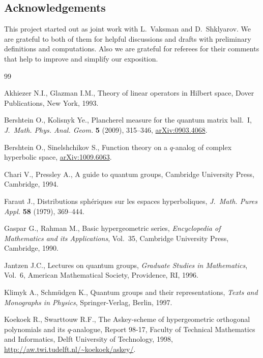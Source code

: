 \documentclass[pdftex]{sigma}
\begin{document}
\subsection*{Acknowledgements}

This project started out as joint work with L.~Vaksman and D.~Shklyarov. We are grateful to both of them for
helpful discussions and drafts with preliminary def\/initions and computations. Also we are grateful for
referees for their comments that help to improve and simplify our exposition.

\begin{thebibliography}{99}

\footnotesize\itemsep=0pt

Akhiezer N.I., Glazman I.M.,
Theory of linear operators in Hilbert space,  Dover Publications, New York, 1993.

Bershtein O., Kolisnyk Ye.,
Plancherel measure for the quantum matrix ball.~I,
{\it J.~Math. Phys. Anal. Geom.} {\bf 5}  (2009), 315--346,
\href{http://arxiv.org/abs/0903.4068}{arXiv:0903.4068}.

Bershtein O., Sinelshchikov S.,
Function theory on a $q$-analog of complex hyperbolic space,
\href{http://arxiv.org/abs/1009.6063}{arXiv:1009.6063}.

Chari V., Pressley A.,
A guide to quantum groups,
Cambridge University Press, Cambridge, 1994.


Faraut J.,
Distributions sph\'eriques sur les espaces hyperboliques,
{\it J.~Math. Pures Appl.} {\bf 58} (1979), 369--444.

Gaspar G., Rahman M.,
Basic hypergeometric series,
{\it Encyclopedia of Mathematics and its Applications}, Vol.~35, Cambridge University Press, Cambridge, 1990.

Jantzen J.C.,
Lectures on quantum groups,
{\it Graduate Studies in Mathematics}, Vol.~6, American Mathema\-ti\-cal Society, Providence, RI, 1996.

Klimyk A., Schm\"udgen K.,
Quantum groups and their representations,
{\it Texts and Monographs in Physics}, Springer-Verlag, Berlin, 1997.

Koekoek R., Swarttouw R.F.,
The Askey-scheme of hypergeometric orthogonal polynomials and its $q$-analogue, Report 98-17,
Faculty of Technical Mathematics and Informatics, Delft University of Technology, 1998, \url{http://aw.twi.tudelft.nl/~koekoek/askey/}.


\end{thebibliography}
\end{document}
